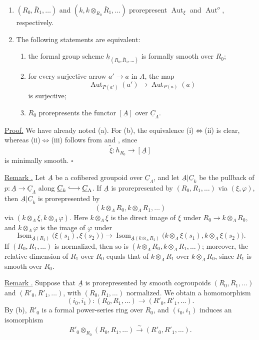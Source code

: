 \begin{enumerate}[label=(\alph*)]
\item $(R_0,\bar R_1,\ldots)$ and
$(k,k\otimes_{R_0}\bar R_1,\ldots)$ prorepresent
$\operatorname{Aut}_\xi$ and $\operatorname{Aut}^{o}$, respectively.

\item The following statements are equivalent:
\begin{enumerate}[label=(\roman*)]
\item the formal group scheme
$\underline h_{(R_0,\bar R_1,\ldots)}$ is formally smooth over $R_0$;
\item for every surjective arrow $a'\longrightarrow a$ in
$\underline A$, the map
\[
 \operatorname{Aut}_{P(a')}(a')\longrightarrow
 \operatorname{Aut}_{P(a)}(a)
\]
is surjective;
\item $R_0$ prorepresents the functor $[\underline A]$ over
$\underline C_\Lambda$.
\end{enumerate}
\end{enumerate}


\underline{Proof.} We have already noted (a). For (b), the
equivalence (i)$\Leftrightarrow$(ii) is clear, whereas
(ii)$\Leftrightarrow$(iii) follows from  and , since
\[
 \widetilde\xi:h_{R_0}\longrightarrow[\underline A]
\]
is minimally smooth. \hfill$\square$

\underline{Remark .} Let $\underline A$ be a cofibered groupoid
over $\underline C_\Lambda$, and let
$\underline A|\underline C_k$ be the pullback of
$p:\underline A\longrightarrow\underline C_\Lambda$ along
$\underline C_k\lhook\joinrel\longrightarrow\underline C_\Lambda$.
If $\underline A$ is prorepresented by $(R_0,R_1,\ldots)$ via
$(\xi,\varphi)$, then $\underline A|\underline C_k$ is
prorepresented by
\[
 (k\otimes_\Lambda R_0,k\otimes_\Lambda R_1,\ldots)
\]
via $(k\otimes_\Lambda\xi,k\otimes_\Lambda\varphi)$. Here
$k\otimes_\Lambda\xi$ is the direct image of $\xi$ under
$R_0\longrightarrow k\otimes_\Lambda R_0$, and
$k\otimes_\Lambda\varphi$ is the image of $\varphi$ under
\[
 \operatorname{Isom}_{\underline A(R_1)}
   \bigl(\xi(s_1),\xi(s_2)\bigr)
 \longrightarrow
 \operatorname{Isom}_{\underline A(k\otimes_\Lambda R_1)}
   \bigl(k\otimes_\Lambda\xi(s_1),
         k\otimes_\Lambda\xi(s_2)\bigr).
\]
If $(R_0,R_1,\ldots)$ is normalized, then so is
$(k\otimes_\Lambda R_0,k\otimes_\Lambda R_1,\ldots)$; moreover, the
relative dimension of $R_1$ over $R_0$ equals that of
$k\otimes_\Lambda R_1$ over $k\otimes_\Lambda R_0$, since $R_1$ is
smooth over $R_0$.

\underline{Remark .} Suppose that $\underline A$ is
prorepresented by smooth cogroupoids $(R_0,R_1,\ldots)$ and
$(R'_0,R'_1,\ldots)$, with $(R_0,R_1,\ldots)$ normalized. We obtain a
homomorphism
\[
 (i_0,i_1):(R_0,R_1,\ldots)\longrightarrow(R'_0,R'_1,\ldots).
\]
By (b), $R'_0$ is a formal power-series ring over $R_0$, and
$(i_0,i_1)$ induces an isomorphism
\[
 R'_0\otimes_{R_0}(R_0,R_1,\ldots)
 \xrightarrow{\ \sim\ }(R'_0,R'_1,\ldots).
\]
